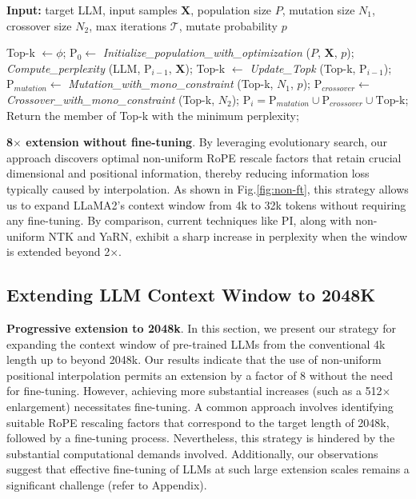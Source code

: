\begin{algorithm}[t]
	\small
	\caption{The search algorithm}
	\textbf{Input:} target LLM, input samples $\mathbf{X}$,   population size $P$, mutation size $N_1$, crossover size $N_2$, max iterations $\mathcal{T}$, mutate probability $p$\\

	\begin{algorithmic}[1]
		\label{alg:search}
		\STATE Top-k $\gets \phi$;	
		\STATE $\text{P}_0 \gets$ \textit{Initialize\_population\_with\_optimization} ($P$, $\mathbf{X}$, $p$); 
		\STATE \textit{Compute\_perplexity} (LLM, $\text{P}_{i-1}$, $\mathbf{X}$);
		\STATE  Top-k $\gets$ \textit{Update\_Topk} (Top-k, $\text{P}_{i-1}$);
		\STATE$\text{P}_{mutation} \gets$ \textit{Mutation\_with\_mono\_constraint} (Top-k, $N_1$, $p$); 
		\STATE $\text{P}_{crossover} \gets$ \textit{Crossover\_with\_mono\_constraint} (Top-k, $N_2$);
		\STATE $\text{P}_i = \text{P}_{mutation} \cup \text{P}_{crossover} \cup \text{Top-k}$;
		\ENDFOR
		\STATE Return the member of Top-k with the minimum perplexity;
	\end{algorithmic}
\end{algorithm}

\textbf{8$\times$ extension without fine-tuning}. By leveraging evolutionary search, our approach discovers optimal non-uniform RoPE rescale factors that retain crucial dimensional and positional information, thereby reducing information loss typically caused by interpolation. As shown in Fig.\ref{fig:non-ft}, this strategy allows us to expand LLaMA2's context window from 4k to 32k tokens without requiring any fine-tuning. By comparison, current techniques like PI, along with non-uniform NTK and YaRN, exhibit a sharp increase in perplexity when the window is extended beyond 2$\times$.

\subsection{Extending LLM Context Window to 2048K}
\label{sec:extendto2048k}

\textbf{Progressive extension to 2048k}. In this section, we present our strategy for expanding the context window of pre-trained LLMs from the conventional 4k length up to beyond 2048k. Our results indicate that the use of non-uniform positional interpolation permits an extension by a factor of 8 without the need for fine-tuning. However, achieving more substantial increases (such as a 512$\times$ enlargement) necessitates fine-tuning. A common approach involves identifying suitable RoPE rescaling factors that correspond to the target length of 2048k, followed by a fine-tuning process. Nevertheless, this strategy is hindered by the substantial computational demands involved. Additionally, our observations suggest that effective fine-tuning of LLMs at such large extension scales remains a significant challenge (refer to Appendix).

